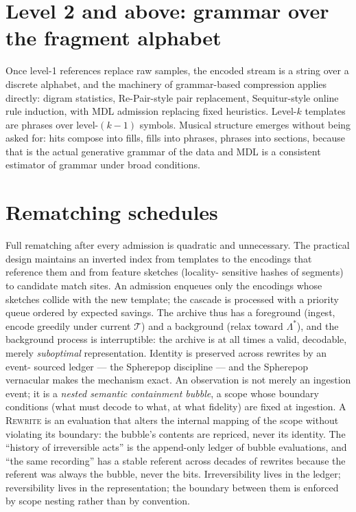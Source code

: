 \documentclass[11pt,oneside]{book}
\theoremstyle{remark}
\newcommand{\Tem}{\mathcal{T}}
\begin{document}
\section{Level 2 and above: grammar over the fragment alphabet}

Once level-1 references replace raw samples, the encoded stream is a
string over a discrete alphabet, and the machinery of grammar-based
compression applies directly: digram statistics, Re-Pair-style pair
replacement, Sequitur-style online rule induction, with MDL admission
replacing fixed heuristics. Level-$k$ templates are phrases over
level-$(k{-}1)$ symbols. Musical structure emerges without being asked
for: hits compose into fills, fills into phrases, phrases into sections,
because that is the actual generative grammar of the data and MDL is a
consistent estimator of grammar under broad conditions.

\section{Rematching schedules}

Full rematching after every admission is quadratic and unnecessary. The
practical design maintains an inverted index from templates to the
encodings that reference them and from feature sketches (locality-
sensitive hashes of segments) to candidate match sites. An admission
enqueues only the encodings whose sketches collide with the new
template; the cascade is processed with a priority queue ordered by
expected savings. The archive thus has a foreground (ingest, encode
greedily under current $\Tem$) and a background (relax toward
$\Lambda^\ast$), and the background process is interruptible: the
archive is at all times a valid, decodable, merely \emph{suboptimal}
representation. Identity is preserved across rewrites by an event-
sourced ledger --- the Spherepop discipline --- and the Spherepop
vernacular makes the mechanism exact. An observation is not merely an
ingestion event; it is a \emph{nested semantic containment bubble},
a scope whose boundary conditions (what must decode to what, at what
fidelity) are fixed at ingestion. A \textsc{Rewrite} is an evaluation
that alters the internal mapping of the scope without violating its
boundary: the bubble's contents are repriced, never its identity. The
``history of irreversible acts'' is the append-only ledger of bubble
evaluations, and ``the same recording'' has a stable referent across
decades of rewrites because the referent was always the bubble, never
the bits. Irreversibility lives in the ledger; reversibility lives in
the representation; the boundary between them is enforced by scope
nesting rather than by convention.
\end{document}
